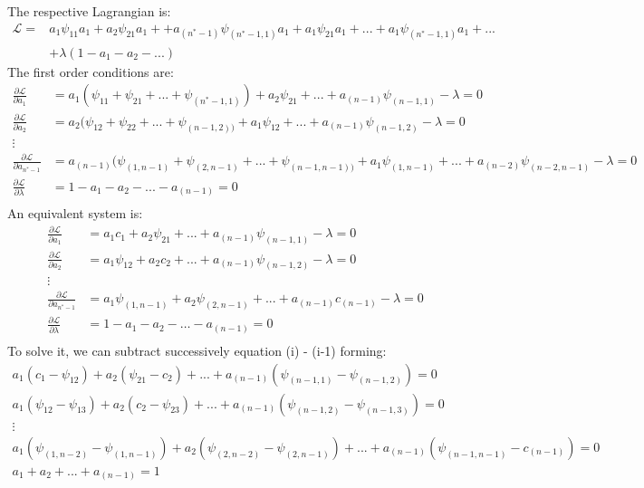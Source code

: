 \documentclass[12pt, a4paper]{article}
\begin{document}
The respective Lagrangian is:
\begin{equation*}
\begin{aligned}
 \mathcal{L} = & a_1 \psi_{11} a_1 + a_2 \psi_{21} a_1 + + a_{(n^*-1)} \psi_{(n^*-1,1)} a_1+a_1 \psi_{21} a_1+ ... +a_1 \psi_{(n^*-1,1)} a_1 + ... \\ & + \lambda (1-a_1-a_2 - ...)
\end{aligned}
\end{equation*}
The first order conditions are:
\begin{equation*}
\begin{aligned}
\frac{\partial \mathcal{L}}{\partial a_1} &= a_1 (\psi_{11}+ \psi_{21} + ... + \psi_{(n^*-1,1)})+a_2 \psi_{21}+ ... + a_{(n-1)} \psi_{(n-1,1)}- \lambda=0 \\
\frac{\partial \mathcal{L}}{\partial a_2} &= a_2 (\psi_{12}+\psi_{22}+...+\psi_{(n-1,2))}+a_1 \psi_{12}+...+a_{(n-1)} \psi_{(n-1,2)}-\lambda=0 \\
\vdots \\
\frac{\partial \mathcal{L}}{\partial a_{n^*-1}} &= a_{(n-1)} (\psi_{(1,n-1 )}+\psi_{(2,n-1)}+ ... +\psi_{(n-1,n-1))}+a_1 \psi_{(1,n-1)}+...+a_{(n-2)} \psi_{(n-2,n-1)}-\lambda=0 \\
\frac{\partial \mathcal{L}}{\partial \lambda}   &=  1-a_1-a_2-...-a_{(n-1)}=0\\
\end{aligned}
\end{equation*}
An equivalent system is:
\begin{equation*}
\begin{aligned}
\frac{\partial \mathcal{L}}{\partial a_1} &= a_1 c_1+a_2 \psi_{21}+...+a_{(n-1)} \psi_{(n-1,1)}-\lambda=0 \\
\frac{\partial \mathcal{L}}{\partial a_2} &= a_1 \psi_{12} +a_2 c_2+ ...+a_{(n-1)} \psi_{(n-1,2)}-\lambda=0 \\
\vdots \\
\frac{\partial \mathcal{L}}{\partial a_{n^*-1}} &= a_1 \psi_{(1,n-1)}+a_2 \psi_{(2,n-1)}+...+a_{(n-1)} c_{(n-1)}-\lambda=0 \\
\frac{\partial \mathcal{L}}{\partial \lambda}   &=  1-a_1-a_2-…-a_{(n-1)}=0 \\
\end{aligned}
\end{equation*}
To solve it, we can subtract successively equation (i) - (i-1) forming:
\begin{equation*}
\begin{aligned}
a_1 (c_1-\psi_{12} )+a_2(\psi_{21}-c_2)+...+a_{(n-1)} (\psi_{(n-1,1)}-\psi_{(n-1,2)})=0 \\
a_1 (\psi_{12}-\psi_{13} )+a_2 (c_2-\psi_{23})+...+a_{(n-1)} (\psi_{(n-1,2)}-\psi_{(n-1,3)})=0 \\
\vdots \\
a_1 (\psi_{(1,n-2)}-\psi_{(1,n-1)} )+a_2 (\psi_{(2,n-2)}-\psi_{(2,n-1 )})+...+a_{(n-1)} (\psi_{(n-1,n-1)}-c_{(n-1)})=0 \\
a_1+a_2+...+a_{(n-1)}=1 
\end{aligned}
\end{equation*}
\end{document}

